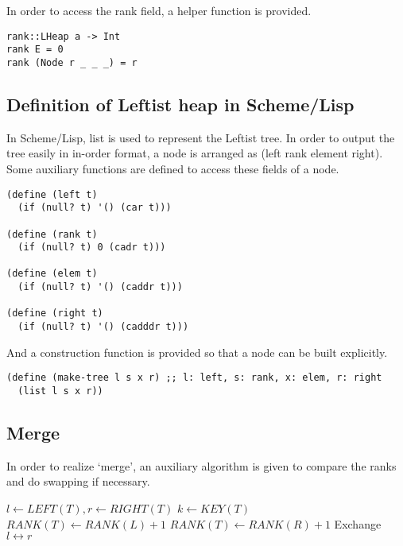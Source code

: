 \documentclass{article}
\begin{document}
In order to access the rank field, a helper function is provided.

\begin{lstlisting}
rank::LHeap a -> Int
rank E = 0
rank (Node r _ _ _) = r
\end{lstlisting}

\subsection*{Definition of Leftist heap in Scheme/Lisp}

In Scheme/Lisp, list is used to represent the Leftist tree. In order
to output the tree easily in in-order format, a node is arranged as
(left rank element right). Some auxiliary functions are defined
to access these fields of a node.

\lstset{language=lisp}
\begin{lstlisting}
(define (left t)
  (if (null? t) '() (car t)))

(define (rank t)
  (if (null? t) 0 (cadr t)))

(define (elem t)
  (if (null? t) '() (caddr t)))

(define (right t)
  (if (null? t) '() (cadddr t)))
\end{lstlisting}

And a construction function is provided so that a node can be
built explicitly.

\begin{lstlisting}
(define (make-tree l s x r) ;; l: left, s: rank, x: elem, r: right
  (list l s x r))
\end{lstlisting}

\subsection{Merge}

In order to realize `merge', an auxiliary algorithm is given to
compare the ranks and do swapping if necessary.

\begin{algorithmic}[1]
  \State $l \gets LEFT(T), r \gets RIGHT(T)$
  \State $k \gets KEY(T)$
    \State $RANK(T) \gets RANK(L) + 1$
  \Else
    \State $RANK(T) \gets RANK(R) + 1$
    \State Exchange $l \leftrightarrow r$
  \EndIf
\EndFunction
\end{algorithmic}
\end{document}
